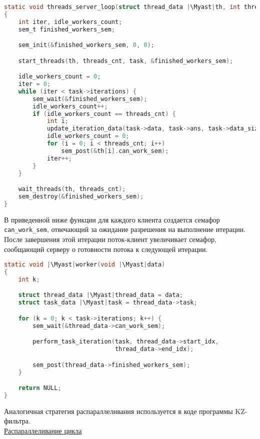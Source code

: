 \begin{lstlisting}[language=C, caption={Функция сервера в стратегии клиент-сервер}, escapeinside=||]
static void threads_server_loop(struct thread_data |\Myast|th, int threads_cnt, struct task_data |\Myast|task)
{
    int iter, idle_workers_count;
    sem_t finished_workers_sem;

    sem_init(&finished_workers_sem, 0, 0);

    start_threads(th, threads_cnt, task, &finished_workers_sem);

    idle_workers_count = 0;
    iter = 0;
    while (iter < task->iterations) {
        sem_wait(&finished_workers_sem);
        idle_workers_count++; 
        if (idle_workers_count == threads_cnt) {
            int i;
            update_iteration_data(task->data, task->ans, task->data_size);
            idle_workers_count = 0;
            for (i = 0; i < threads_cnt; i++)
                sem_post(&th[i].can_work_sem);
            iter++;
        }
    } 

    wait_threads(th, threads_cnt);
    sem_destroy(&finished_workers_sem);
}
\end{lstlisting}

В приведенной ниже функции для каждого клиента создается семафор \texttt{can\_work\_sem}, отвечающий за ожидание разрешения на выполнение итерации. После завершения этой итерации поток-клиент увеличивает семафор, сообщающий серверу о готовности потока к следующей итерации.
\begin{lstlisting}[language=C, caption={Функция клиента (рабочего) в стратегии клиент-сервер}, escapeinside=||]
static void |\Myast|worker(void |\Myast|data)
{
    int k;

    struct thread_data |\Myast|thread_data = data;
    struct task_data |\Myast|task = thread_data->task;

    for (k = 0; k < task->iterations; k++) {
        sem_wait(&thread_data->can_work_sem);

        perform_task_iteration(task, thread_data->start_idx,
                               thread_data->end_idx);

        sem_post(thread_data->finished_workers_sem);
    }

    return NULL;
} 
\end{lstlisting}

Аналогичная стратегия распараллеливания используется в коде программы KZ-фильтра.
\\
\underline{Распараллеливание цикла}

